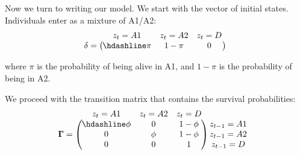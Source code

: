 \documentclass[
  12pt,
]{krantz}
\begin{document}
Now we turn to writing our model. We start with the vector of initial states. Individuals enter as a mixture of A1/A2:
\[\begin{matrix}
& \\
\mathbf{\delta} =
  \left ( \vphantom{ \begin{matrix} 12 \end{matrix} } \right .
          \end{matrix}
          \hspace{-1.2em}
          \begin{matrix}
          z_t=A1 & z_t=A2 & z_t=D \\ \hdashline
          \pi & 1 - \pi & 0\\
          \end{matrix}
          \hspace{-0.2em}
          \begin{matrix}
          & \\
          \left . \vphantom{ \begin{matrix} 12 \end{matrix} } \right )
\begin{matrix}
\end{matrix}
\end{matrix}\]

where \(\pi\) is the probability of being alive in A1, and \(1 - \pi\) is the probability of being in A2.

We proceed with the transition matrix that contains the survival probabilities:
\[\begin{matrix}
& \\
\mathbf{\Gamma} =
  \left ( \vphantom{ \begin{matrix} 12 \\ 12 \\ 12 \end{matrix} } \right .
          \end{matrix}
          \hspace{-1.2em}
          \begin{matrix}
          z_t=A1 & z_t=A2 & z_t=D \\ \hdashline
          \phi  & 0 & 1 - \phi\\
          0 & \phi & 1 - \phi\\
          0 & 0 & 1
          \end{matrix}
          \hspace{-0.2em}
          \begin{matrix}
          & \\
          \left . \vphantom{ \begin{matrix} 12 \\ 12 \\ 12 \end{matrix} } \right )
\begin{matrix}
z_{t-1}=A1 \\ z_{t-1}=A2 \\ z_{t-1}=D
\end{matrix}
\end{matrix}\]
\end{document}
